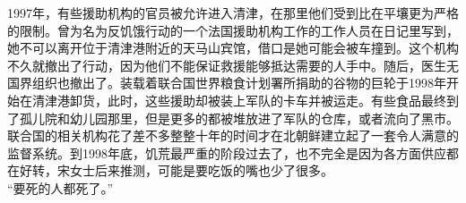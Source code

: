 1997年，有些援助机构的官员被允许进入清津，在那里他们受到比在平壤更为严格的限制。曾为名为反饥饿行动的一个法国援助机构工作的工作人员在日记里写到，她不可以离开位于清津港附近的天马山宾馆，借口是她可能会被车撞到。这个机构不久就撤出了行动，因为他们不能保证救援能够抵达需要的人手中。随后，医生无国界组织也撤出了。装载着联合国世界粮食计划署所捐助的谷物的巨轮于1998年开始在清津港卸货，此时，这些援助却被装上军队的卡车并被运走。有些食品最终到了孤儿院和幼儿园那里，但是更多的都被堆放进了军队的仓库，或者流向了黑市。联合国的相关机构花了差不多整整十年的时间才在北朝鲜建立起了一套令人满意的监督系统。到1998年底，饥荒最严重的阶段过去了，也不完全是因为各方面供应都在好转，宋女士后来推测，可能是要吃饭的嘴也少了很多。\\

“要死的人都死了。”\\
